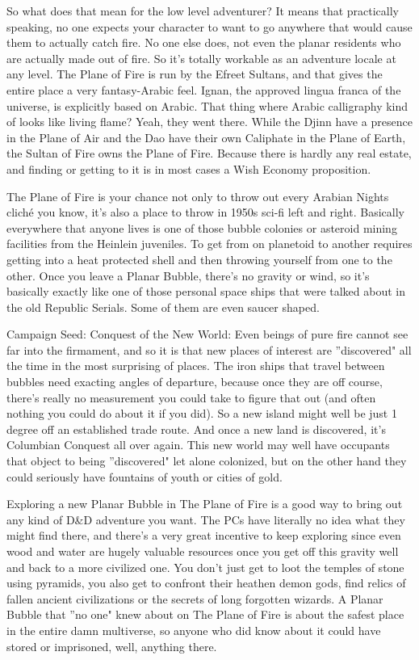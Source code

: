 So what does that mean for the low level adventurer? It means that practically speaking, no one expects your character to want to go anywhere that would cause them to actually catch fire. No one else does, not even the planar residents who are actually made out of fire. So it's totally workable as an adventure locale at any level. The Plane of Fire is run by the Efreet Sultans, and that gives the entire place a very fantasy-Arabic feel. Ignan, the approved lingua franca of the universe, is explicitly based on Arabic. That thing where Arabic calligraphy kind of looks like living flame? Yeah, they went there. While the Djinn have a presence in the Plane of Air and the Dao have their own Caliphate in the Plane of Earth, the Sultan of Fire owns the Plane of Fire. Because there is hardly any real estate, and finding or getting to it is in most cases a Wish Economy proposition.

The Plane of Fire is your chance not only to throw out every Arabian Nights cliché you know, it's also a place to throw in 1950s sci-fi left and right. Basically everywhere that anyone lives is one of those bubble colonies or asteroid mining facilities from the Heinlein juveniles. To get from on planetoid to another requires getting into a heat protected shell and then throwing yourself from one to the other. Once you leave a Planar Bubble, there's no gravity or wind, so it's basically exactly like one of those personal space ships that were talked about in the old Republic Serials. Some of them are even saucer shaped.

Campaign Seed: Conquest of the New World: Even beings of pure fire cannot see far into the firmament, and so it is that new places of interest are ''discovered" all the time in the most surprising of places. The iron ships that travel between bubbles need exacting angles of departure, because once they are off course, there's really no measurement you could take to figure that out (and often nothing you could do about it if you did). So a new island might well be just 1 degree off an established trade route. And once a new land is discovered, it's Columbian Conquest all over again. This new world may well have occupants that object to being ''discovered" let alone colonized, but on the other hand they could seriously have fountains of youth or cities of gold.

Exploring a new Planar Bubble in The Plane of Fire is a good way to bring out any kind of D\&D adventure you want. The PCs have literally no idea what they might find there, and there's a very great incentive to keep exploring since even wood and water are hugely valuable resources once you get off this gravity well and back to a more civilized one. You don't just get to loot the temples of stone using pyramids, you also get to confront their heathen demon gods, find relics of fallen ancient civilizations or the secrets of long forgotten wizards. A Planar Bubble that ''no one" knew about on The Plane of Fire is about the safest place in the entire damn multiverse, so anyone who did know about it could have stored or imprisoned, well, anything there.

